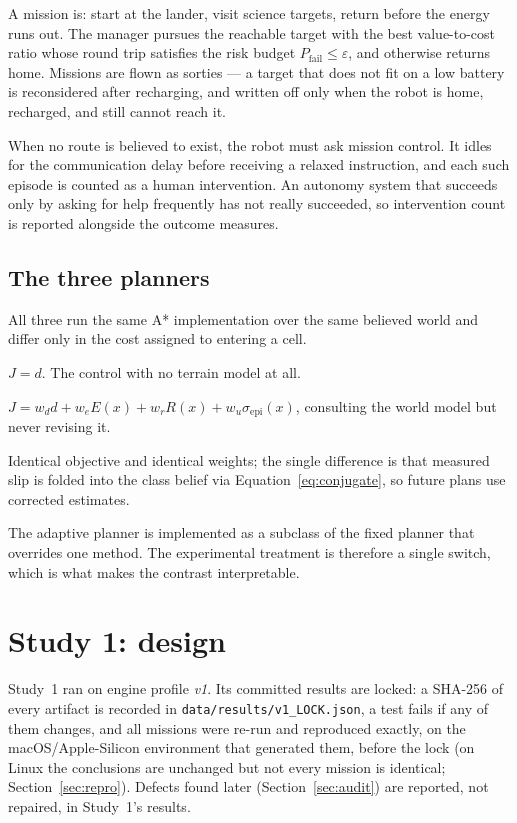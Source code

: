 \documentclass[11pt]{article}
\begin{document}
A mission is: start at the lander, visit science targets, return before the
energy runs out. The manager pursues the reachable target with the best
value-to-cost ratio whose round trip satisfies the risk budget
$P_{\mathrm{fail}} \le \varepsilon$, and otherwise returns home. Missions are
flown as sorties --- a target that does not fit on a low battery is
reconsidered after recharging, and written off only when the robot is home,
recharged, and still cannot reach it.

When no route is believed to exist, the robot must ask mission control. It
idles for the communication delay before receiving a relaxed instruction, and
each such episode is counted as a human intervention. An autonomy system that
succeeds only by asking for help frequently has not really succeeded, so
intervention count is reported alongside the outcome measures.

\subsection{The three planners}

All three run the same A* implementation over the same believed world and
differ only in the cost assigned to entering a cell.

\begin{description}[leftmargin=2.2em,style=nextline]
  \item[Distance-only A*] $J = d$. The control with no terrain model at all.
  \item[Fixed risk-aware A*] $J = w_d d + w_e E(x) + w_r R(x) + w_u \sigma_{\mathrm{epi}}(x)$,
  consulting the world model but never revising it.
  \item[Adaptive risk-aware A*] Identical objective and identical weights; the
  single difference is that measured slip is folded into the class belief via
  Equation~\ref{eq:conjugate}, so future plans use corrected estimates.
\end{description}

The adaptive planner is implemented as a subclass of the fixed planner that
overrides one method. The experimental treatment is therefore a single switch,
which is what makes the contrast interpretable.

\section{Study 1: design}
\label{sec:study1}

Study~1 ran on engine profile \emph{v1}. Its committed results are locked: a
SHA-256 of every artifact is recorded in \texttt{data/results/v1\_LOCK.json},
a test fails if any of them changes, and all \MainMissions{} missions were
re-run and reproduced exactly, on the macOS/Apple-Silicon environment that
generated them, before the lock (on Linux the conclusions are unchanged but not
every mission is identical; Section~\ref{sec:repro}). Defects found later
(Section~\ref{sec:audit}) are reported, not repaired, in Study~1's results.
\end{document}
